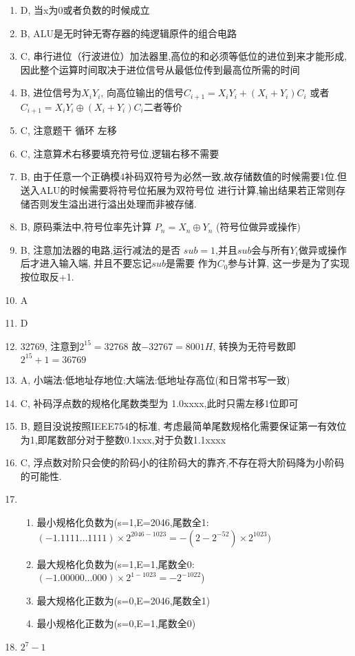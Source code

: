 \documentclass[12pt, a4paper, oneside, UTF8]{ctexbook}
\begin{document}
\begin{enumerate}[label=\arabic*.\textbf{答案}:]
\item D, 当x为0或者负数的时候成立 
\item B, ALU是无时钟无寄存器的纯逻辑原件的组合电路
\item C, 串行进位（行波进位）加法器里,高位的和必须等低位的进位到来才能形成,
因此整个运算时间取决于进位信号从最低位传到最高位所需的时间
\item B, 进位信号为$X_iY_i$, 向高位输出的信号$C_{i+1} = X_iY_i + (X_i + Y_i)C_i$ 或者
$C_{i+1} = X_iY_i \oplus (X_i + Y_i)C_i$二者等价
\item C, 注意题干{\color{red} 循环} 左移
\item C, 注意算术右移要填充符号位,逻辑右移不需要
\item B, 由于任意一个正确模4补码双符号为必然一致,故存储数值的时候需要1位.但送入ALU的时候需要将符号位拓展为双符号位
进行计算,输出结果若正常则存储否则发生溢出进行溢出处理而非被存储. 
\item B, 原码乘法中,符号位率先计算 $P_n = X_n \oplus Y_n$ (符号位做异或操作)
\item B, 注意加法器的电路,运行减法的是否 $sub=1$,并且$sub$会与所有$Y_i$做异或操作后才进入输入端, 并且不要忘记$sub$是需要
作为$C_0$参与计算, 这一步是为了实现按位取反+1.
\item A
\item D 
\item 32769, 注意到$2^{15} = 32768$ 故$-32767 = 8001H$, 转换为无符号数即$2^{15}+1=36769$
\item A, 小端法:低地址存地位;大端法:低地址存高位(和日常书写一致)
\item C, 补码浮点数的规格化尾数类型为{\color{red} 1.0xxxx},此时只需左移1位即可
\item B, 题目没说按照IEEE754的标准, 考虑最简单尾数规格化需要保证第一有效位为1,即尾数部分对于整数0.1xxx,对于负数1.1xxxx 
\item C, 浮点数对阶只会使的阶码小的往阶码大的靠齐,不存在将大阶码降为小阶码的可能性. 
\item 
\begin{enumerate}
    \item 最小规格化负数为(s=1,E=2046,尾数全1: $(-1.1111\ldots1111)\times 2^{2046-1023}=-(2-2^{-52})\times 2^{1023})$ 
    \item 最大规格化负数为(s=1,E=1,尾数全0: $(-1.00000\ldots000)\times 2^{1-1023}=-2^{-1022}$)
    \item 最大规格化正数为(s=0,E=2046,尾数全1) 
    \item 最小规格化正数为(s=0,E=1,尾数全0)
\end{enumerate}
\item $2^7 - 1$

\end{enumerate}
\end{document}
